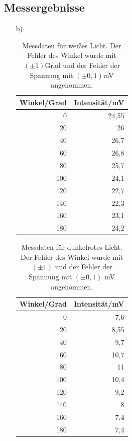 \documentclass[12pt]{scrartcl}
\begin{document}
\subsection{Messergebnisse}
\begin{enumerate}
\item[b)]

\begin{table}[htbp]
\caption{Messdaten für weißes Licht. Der Fehler des Winkel wurde mit $(\pm 1)$Grad und der Fehler der Spannung mit $(\pm 0,1)$mV angenommen.}
\begin{center}
\begin{tabular}{|r|r|}
\hline
\multicolumn{1}{|l|}{Winkel/Grad} & \multicolumn{1}{l|}{Intensität/mV} \\ \hline
0 & 24,55 \\ \hline
20 & 26 \\ \hline
40 & 26,7 \\ \hline
60 & 26,8 \\ \hline
80 & 25,7 \\ \hline
100 & 24,1 \\ \hline
120 & 22,7 \\ \hline
140 & 22,3 \\ \hline
160 & 23,1 \\ \hline
180 & 24,2 \\ \hline
\end{tabular}
\end{center}
\label{tab:a_5_b_w}
\end{table}


\begin{table}[H]
\caption{Messdaten für dunkelrotes Licht. Der Fehler des Winkel wurde mit $(\pm 1)$ und der Fehler der Spannung mit $(\pm 0,1)$ mV angenommen.}
\begin{center}
\begin{tabular}{|r|r|}
\hline
\multicolumn{1}{|l|}{Winkel/Grad} & \multicolumn{1}{l|}{Intensität/mV} \\ \hline
0 & 7,6 \\ \hline
20 & 8,55 \\ \hline
40 & 9,7 \\ \hline
60 & 10,7 \\ \hline
80 & 11 \\ \hline
100 & 10,4 \\ \hline
120 & 9,2 \\ \hline
140 & 8 \\ \hline
160 & 7,4 \\ \hline
180 & 7,4 \\ \hline
\end{tabular}
\end{center}
\label{tab:a_5_b_dr}
\end{table}


\end{enumerate}
\end{document}
